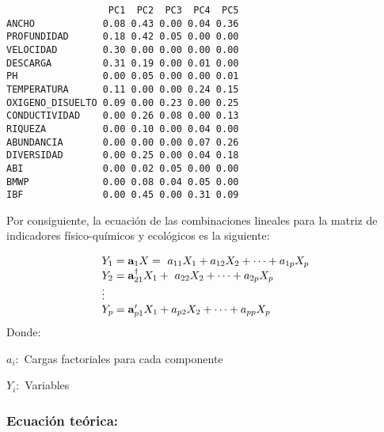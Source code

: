 \documentclass[
  10pt,
  letterpaper,
  DIV=11,
  numbers=noendperiod]{scrreprt}
\newenvironment{Shaded}{\begin{snugshade}}{\end{snugshade}}
\newcommand{\DecValTok}[1]{\textcolor[rgb]{0.68,0.00,0.00}{#1}}
\newcommand{\FloatTok}[1]{\textcolor[rgb]{0.68,0.00,0.00}{#1}}
\newcommand{\FunctionTok}[1]{\textcolor[rgb]{0.28,0.35,0.67}{#1}}
\newcommand{\NormalTok}[1]{\textcolor[rgb]{0.00,0.23,0.31}{#1}}
\newcommand{\SpecialCharTok}[1]{\textcolor[rgb]{0.37,0.37,0.37}{#1}}
\begin{document}
\begin{Shaded}
\end{Shaded}

\begin{verbatim}
                  PC1  PC2  PC3  PC4  PC5
ANCHO            0.08 0.43 0.00 0.04 0.36
PROFUNDIDAD      0.18 0.42 0.05 0.00 0.00
VELOCIDAD        0.30 0.00 0.00 0.00 0.00
DESCARGA         0.31 0.19 0.00 0.01 0.00
PH               0.00 0.05 0.00 0.00 0.01
TEMPERATURA      0.11 0.00 0.00 0.24 0.15
OXIGENO_DISUELTO 0.09 0.00 0.23 0.00 0.25
CONDUCTIVIDAD    0.00 0.26 0.08 0.00 0.13
RIQUEZA          0.00 0.10 0.00 0.04 0.00
ABUNDANCIA       0.00 0.00 0.00 0.07 0.26
DIVERSIDAD       0.00 0.25 0.00 0.04 0.18
ABI              0.00 0.02 0.05 0.00 0.00
BMWP             0.00 0.08 0.04 0.05 0.00
IBF              0.00 0.45 0.00 0.31 0.09
\end{verbatim}

Por consiguiente, la ecuación de las combinaciones lineales para la
matriz de indicadores físico-químicos y ecológicos es la siguiente:

\[\begin{array}{l}{{Y_{1}={\bf a}_{1}X=\ a_{11}X_{1}+a_{12}X_{2}+\cdots+a_{1p}X_{p}}}\\ {{Y_{2}={\bf a}_{21}^{\dagger}X_{1}+\ a_{22}X_{2}+\cdots+a_{2p}X_{p}}}\\ {{\vdots}}\\ {{Y_{p}={\bf a}_{p1}^{\prime}X_{1}+a_{p2}X_{2}+\cdots+a_{p p}X_{p}}}\end{array}\]
Donde:

\(a_{i}:\) Cargas factoriales para cada componente

\(Y_{i}:\) Variables

\hypertarget{ecuaciuxf3n-teuxf3rica}{%
\subsubsection{\texorpdfstring{\textbf{Ecuación
teórica:}}{Ecuación teórica:}}\label{ecuaciuxf3n-teuxf3rica}}
\end{document}

